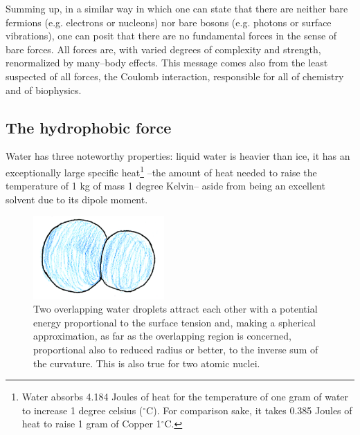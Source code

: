 \begin{subappendices}
Summing up, in a similar way in which one can state that there are neither bare fermions (e.g. electrons or nucleons) nor bare bosons (e.g. photons or surface vibrations),  one can posit that there are no fundamental forces in the sense of bare
forces.  All forces are, with varied degrees of complexity and strength, renormalized 
by many--body effects. This message comes also from  the least suspected of all forces, the Coulomb interaction, responsible for all of chemistry and of biophysics.
\subsection{The hydrophobic force}
Water has three noteworthy properties: liquid water is heavier than ice, it has an exceptionally large specific heat\footnote{Water absorbs 4.184 Joules of heat for the temperature of one gram of water to increase 1 degree celsius ($^\circ$C). For comparison sake, it takes 0.385 Joules of heat to raise 1 gram of Copper 1$^\circ$C.} --the amount of heat needed to raise the temperature of 1 kg of mass 1 degree Kelvin-- aside from being an excellent solvent due to its dipole moment.
\begin{figure}
\centerline{\includegraphics[width=5cm]{C8/figsC8/fig6G4.pdf}}
\caption{Two overlapping water droplets attract each other with a potential energy proportional to the surface
tension and, making a spherical approximation, as far as the overlapping region is concerned, proportional
also to reduced radius or better, to the inverse sum of the curvature. This is also true for two atomic nuclei.}\label{fig6G4}
\end{figure}


\end{subappendices}
